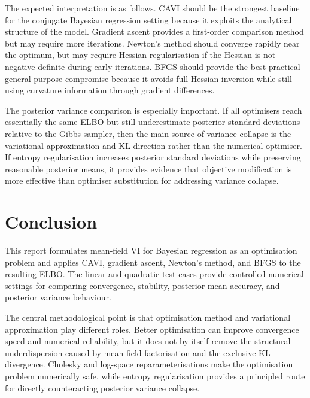 \documentclass[11pt,a4paper]{article}
\begin{document}
The expected interpretation is as follows. CAVI should be the strongest baseline for the conjugate Bayesian regression setting because it exploits the analytical structure of the model. Gradient ascent provides a first-order comparison method but may require more iterations. Newton's method should converge rapidly near the optimum, but may require Hessian regularisation if the Hessian is not negative definite during early iterations. BFGS should provide the best practical general-purpose compromise because it avoids full Hessian inversion while still using curvature information through gradient differences.

The posterior variance comparison is especially important. If all optimisers reach essentially the same ELBO but still underestimate posterior standard deviations relative to the Gibbs sampler, then the main source of variance collapse is the variational approximation and KL direction rather than the numerical optimiser. If entropy regularisation increases posterior standard deviations while preserving reasonable posterior means, it provides evidence that objective modification is more effective than optimiser substitution for addressing variance collapse.

\section*{Conclusion}

This report formulates mean-field VI for Bayesian regression as an optimisation problem and applies CAVI, gradient ascent, Newton's method, and BFGS to the resulting ELBO. The linear and quadratic test cases provide controlled numerical settings for comparing convergence, stability, posterior mean accuracy, and posterior variance behaviour.

The central methodological point is that optimisation method and variational approximation play different roles. Better optimisation can improve convergence speed and numerical reliability, but it does not by itself remove the structural underdispersion caused by mean-field factorisation and the exclusive KL divergence. Cholesky and log-space reparameterisations make the optimisation problem numerically safe, while entropy regularisation provides a principled route for directly counteracting posterior variance collapse.

\newpage
\nocite{*}
\printbibliography
\setcounter{secnumdepth}{1}
\appendix
\renewcommand{\thesection}{Appendix~\Alph{section}}
\end{document}
